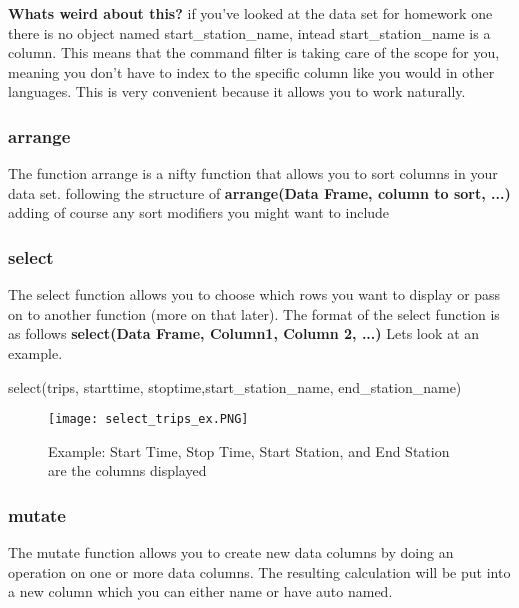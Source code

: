 \begin{flushleft}
\textbf{Whats weird about this?} if you've looked at the data set for homework one there is no object named start\_station\_name, intead start\_station\_name is a column. This means that the command filter is taking care of the scope for you, meaning you don't have to index to the specific column like you would in other languages. This is very convenient because it allows you to work naturally.
\end{flushleft}

\subsubsection{arrange}
\begin{flushleft}
The function arrange is a nifty function that allows you to sort columns in your data set. following the structure of \textbf{arrange(Data Frame, column to sort, ...)} adding of course any sort modifiers you might want to include
\end{flushleft}


\subsubsection{select}
\begin{flushleft}
The select function allows you to choose which rows you want to display or pass on to another function (more on that later). The format of the select function is as follows \textbf{select(Data Frame, Column1, Column 2, ...)} Lets look at an example.
\end{flushleft}

\begin{center}
select(trips, starttime, stoptime,start\_station\_name, end\_station\_name)
\end{center}

\begin{figure}[H]
    \centering
    \texttt{[image: select\_trips\_ex.PNG]}
    \caption{Example: Start Time, Stop Time, Start Station, and End Station are the columns displayed}
    \label{fig:select_trips_ex}
\end{figure}


\subsubsection{mutate}
\begin{flushleft}
The mutate function allows you to create new data columns by doing an operation on one or more data columns. The resulting calculation will be put into a new column which you can either name or have auto named. 
\end{flushleft}

